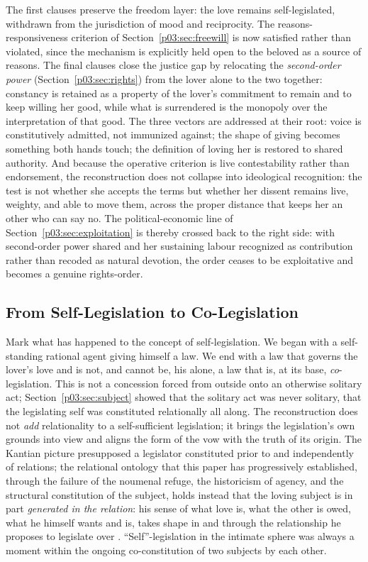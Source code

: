 \documentclass[11pt,a4paper]{article}
\begin{document}
The first clauses preserve the freedom layer: the love remains self-legislated, withdrawn from the jurisdiction of mood and reciprocity. The reasons-responsiveness criterion of Section~\ref{p03:sec:freewill} is now satisfied rather than violated, since the mechanism is explicitly held open to the beloved as a source of reasons. The final clauses close the justice gap by relocating the \emph{second-order power} (Section~\ref{p03:sec:rights}) from the lover alone to the two together: constancy is retained as a property of the lover's commitment to remain and to keep willing her good, while what is surrendered is the monopoly over the interpretation of that good. The three vectors are addressed at their root: voice is constitutively admitted, not immunized against; the shape of giving becomes something both hands touch; the definition of loving her is restored to shared authority. And because the operative criterion is live contestability rather than endorsement, the reconstruction does not collapse into ideological recognition: the test is not whether she accepts the terms but whether her dissent remains live, weighty, and able to move them, across the proper distance that keeps her an other who can say no. The political-economic line of Section~\ref{p03:sec:exploitation} is thereby crossed back to the right side: with second-order power shared and her sustaining labour recognized as contribution rather than recoded as natural devotion, the order ceases to be exploitative and becomes a genuine rights-order.

\subsection{From Self-Legislation to Co-Legislation}

Mark what has happened to the concept of self-legislation. We began with a self-standing rational agent giving himself a law. We end with a law that governs the lover's love and is not, and cannot be, his alone, a law that is, at its base, \emph{co}-legislation. This is not a concession forced from outside onto an otherwise solitary act; Section~\ref{p03:sec:subject} showed that the solitary act was never solitary, that the legislating self was constituted relationally all along. The reconstruction does not \emph{add} relationality to a self-sufficient legislation; it brings the legislation's own grounds into view and aligns the form of the vow with the truth of its origin. The Kantian picture presupposed a legislator constituted prior to and independently of relations; the relational ontology that this paper has progressively established, through the failure of the noumenal refuge, the historicism of agency, and the structural constitution of the subject, holds instead that the loving subject is in part \emph{generated in the relation}: his sense of what love is, what the other is owed, what he himself wants and is, takes shape in and through the relationship he proposes to legislate over \parencite{nedelsky1989reconceiving, mackenzie2000relational, helm2010love}. ``Self''-legislation in the intimate sphere was always a moment within the ongoing co-constitution of two subjects by each other.
\end{document}
